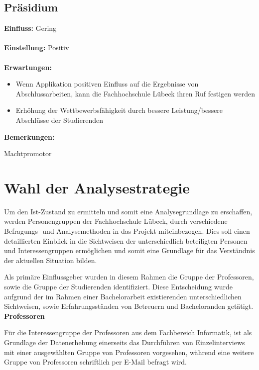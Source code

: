 \documentclass{scrreprt}
\begin{document}
\subsection{Präsidium}
\textbf{Einfluss:} Gering\\\\
\textbf{Einstellung:} Positiv\\\\
\textbf{Erwartungen:}
\begin{itemize}
\item Wenn Applikation positiven Einfluss auf die Ergebnisse von Abschlussarbeiten, kann die Fachhochschule Lübeck ihren Ruf festigen werden
\item Erhöhung der Wettbewerbsfähigkeit durch bessere Leistung/bessere Abschlüsse der Studierenden
\end{itemize}
\textbf{Bemerkungen:}\par Machtpromotor
\newpage

\section{Wahl der Analysestrategie}
\par Um den Ist-Zustand zu ermitteln und somit eine Analysegrundlage zu erschaffen, werden Personengruppen der Fachhochschule Lübeck, durch verschiedene Befragungs- und Analysemethoden in das Projekt miteinbezogen. Dies soll einen detaillierten Einblick in die Sichtweisen der unterschiedlich beteiligten Personen und Interessengruppen ermöglichen und somit eine Grundlage für das Verständnis der aktuellen Situation bilden.

\par Als primäre Einflussgeber wurden in diesem Rahmen die Gruppe der Professoren, sowie die Gruppe der Studierenden identifiziert. Diese Entscheidung wurde aufgrund der im Rahmen einer Bachelorarbeit  existierenden unterschiedlichen Sichtweisen, sowie Erfahrungsständen von Betreuern und Bacheloranden getätigt. \\

\textbf{Professoren}
\par Für die Interessengruppe der Professoren aus dem Fachbereich Informatik, ist als Grundlage der Datenerhebung einerseits das Durchführen von Einzelinterviews mit einer ausgewählten Gruppe von Professoren vorgesehen, während eine weitere Gruppe von Professoren schriftlich per E-Mail befragt wird. 
\end{document}
